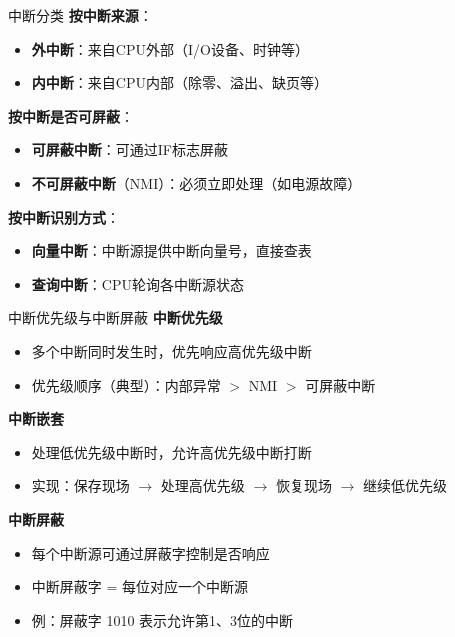 \documentclass[10pt, aspectratio=169]{beamer}
\begin{document}
\begin{frame}{中断分类}
    \textbf{按中断来源}：
    \begin{itemize}
        \item \textbf{外中断}：来自CPU外部（I/O设备、时钟等）
        \item \textbf{内中断}：来自CPU内部（除零、溢出、缺页等）
    \end{itemize}
    \vspace{0.3em}
    \textbf{按中断是否可屏蔽}：
    \begin{itemize}
        \item \textbf{可屏蔽中断}：可通过IF标志屏蔽
        \item \textbf{不可屏蔽中断}（NMI）：必须立即处理（如电源故障）
    \end{itemize}
    \vspace{0.3em}
    \textbf{按中断识别方式}：
    \begin{itemize}
        \item \textbf{向量中断}：中断源提供中断向量号，直接查表
        \item \textbf{查询中断}：CPU轮询各中断源状态
    \end{itemize}
\end{frame}

\begin{frame}{中断优先级与中断屏蔽}
    \textbf{中断优先级}
    \begin{itemize}
        \item 多个中断同时发生时，优先响应高优先级中断
        \item 优先级顺序（典型）：内部异常 $>$ NMI $>$ 可屏蔽中断
    \end{itemize}
    \vspace{0.3em}
    \textbf{中断嵌套}
    \begin{itemize}
        \item 处理低优先级中断时，允许高优先级中断打断
        \item 实现：保存现场 $\rightarrow$ 处理高优先级 $\rightarrow$ 恢复现场 $\rightarrow$ 继续低优先级
    \end{itemize}
    \vspace{0.3em}
    \textbf{中断屏蔽}
    \begin{itemize}
        \item 每个中断源可通过屏蔽字控制是否响应
        \item 中断屏蔽字 = 每位对应一个中断源
        \item 例：屏蔽字 1010 表示允许第1、3位的中断
    \end{itemize}
\end{frame}
\end{document}
